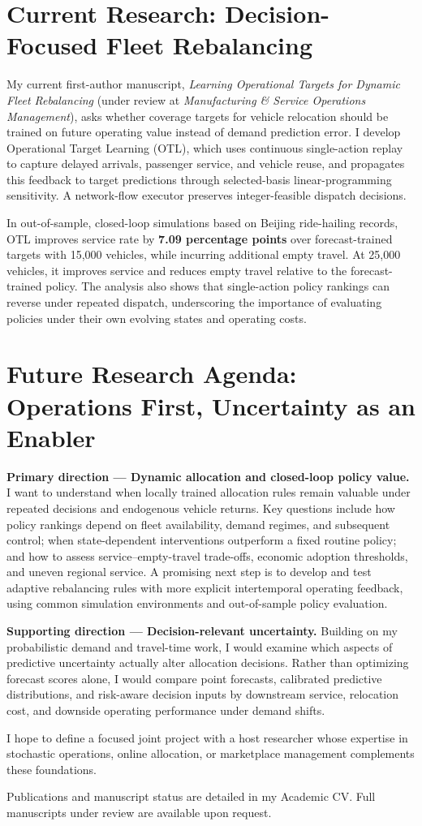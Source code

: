 \documentclass[10pt,letterpaper]{article}
\begin{document}
\section*{Current Research: Decision-Focused Fleet Rebalancing}
My current first-author manuscript, \emph{Learning Operational Targets for Dynamic Fleet Rebalancing} (under review at \emph{Manufacturing \& Service Operations Management}), asks whether coverage targets for vehicle relocation should be trained on future operating value instead of demand prediction error. I develop Operational Target Learning (OTL), which uses continuous single-action replay to capture delayed arrivals, passenger service, and vehicle reuse, and propagates this feedback to target predictions through selected-basis linear-programming sensitivity. A network-flow executor preserves integer-feasible dispatch decisions.

In out-of-sample, closed-loop simulations based on Beijing ride-hailing records, OTL improves service rate by \textbf{7.09 percentage points} over forecast-trained targets with 15,000 vehicles, while incurring additional empty travel. At 25,000 vehicles, it improves service and reduces empty travel relative to the forecast-trained policy. The analysis also shows that single-action policy rankings can reverse under repeated dispatch, underscoring the importance of evaluating policies under their own evolving states and operating costs.

\section*{Future Research Agenda: Operations First, Uncertainty as an Enabler}
\textbf{Primary direction --- Dynamic allocation and closed-loop policy value.} I want to understand when locally trained allocation rules remain valuable under repeated decisions and endogenous vehicle returns. Key questions include how policy rankings depend on fleet availability, demand regimes, and subsequent control; when state-dependent interventions outperform a fixed routine policy; and how to assess service--empty-travel trade-offs, economic adoption thresholds, and uneven regional service. A promising next step is to develop and test adaptive rebalancing rules with more explicit intertemporal operating feedback, using common simulation environments and out-of-sample policy evaluation.

\textbf{Supporting direction --- Decision-relevant uncertainty.} Building on my probabilistic demand and travel-time work, I would examine which aspects of predictive uncertainty actually alter allocation decisions. Rather than optimizing forecast scores alone, I would compare point forecasts, calibrated predictive distributions, and risk-aware decision inputs by downstream service, relocation cost, and downside operating performance under demand shifts.

I hope to define a focused joint project with a host researcher whose expertise in stochastic operations, online allocation, or marketplace management complements these foundations.

\vfill
{\footnotesize\color{muted}Publications and manuscript status are detailed in my Academic CV. Full manuscripts under review are available upon request.}
\end{document}
